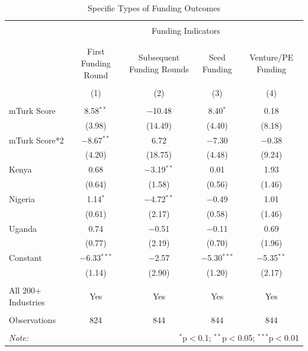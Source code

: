 \documentclass[12pt]{article}
\begin{document}
\begin{table}[!htbp] \centering 
  \caption{Specific Types of Funding Outcomes} 
  \label{} 
\scriptsize 
\begin{tabular}{@{\extracolsep{5pt}}lcccc} 
\\[-1.8ex]\hline 
\hline \\[-1.8ex] 
 & \multicolumn{4}{c}{Funding Indicators} \\ 
\cline{2-5} 
\\[-1.8ex] &  &  &  &  \\ 
 & First Funding Round & Subsequent Funding Rounds & Seed Funding & Venture/PE Funding \\ 
\\[-1.8ex] & (1) & (2) & (3) & (4)\\ 
\hline \\[-1.8ex] 
 mTurk Score & 8.58$^{**}$ & $-$10.48 & 8.40$^{*}$ & 0.18 \\ 
  & (3.98) & (14.49) & (4.40) & (8.18) \\ 
  mTurk Score*2 & $-$8.67$^{**}$ & 6.72 & $-$7.30 & $-$0.38 \\ 
  & (4.20) & (18.75) & (4.48) & (9.24) \\ 
  Kenya & 0.68 & $-$3.19$^{**}$ & 0.01 & 1.93 \\ 
  & (0.64) & (1.58) & (0.56) & (1.46) \\ 
  Nigeria & 1.14$^{*}$ & $-$4.72$^{**}$ & $-$0.49 & 1.01 \\ 
  & (0.61) & (2.17) & (0.58) & (1.46) \\ 
  Uganda & 0.74 & $-$0.51 & $-$0.11 & 0.69 \\ 
  & (0.77) & (2.19) & (0.70) & (1.96) \\ 
  Constant & $-$6.33$^{***}$ & $-$2.57 & $-$5.30$^{***}$ & $-$5.35$^{**}$ \\ 
  & (1.14) & (2.90) & (1.20) & (2.17) \\ 
 \hline \\[-1.8ex] 
 All 200+ Industries & Yes & Yes & Yes & Yes \\ 
  \hline \\[-1.8ex] 
Observations & 824 & 844 & 844 & 844 \\ 
\hline 
\hline \\[-1.8ex] 
\textit{Note:}  & \multicolumn{4}{r}{$^{*}$p$<$0.1; $^{**}$p$<$0.05; $^{***}$p$<$0.01} \\ 
\end{tabular} 
\end{table} 
\end{document}

